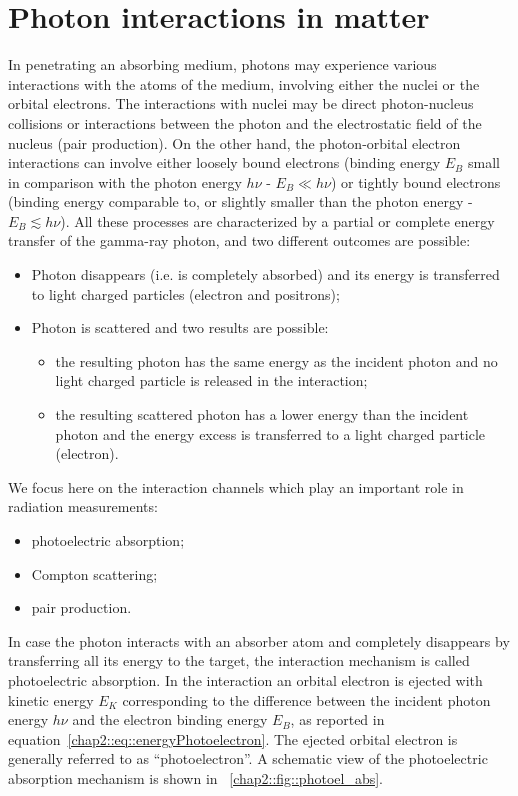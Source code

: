 \section{Photon interactions in matter}\label{chap2::subsec::PhotonInteractions}

In penetrating an absorbing medium, photons may experience various interactions with the atoms of the medium, involving either the nuclei or the orbital electrons. The interactions with nuclei may be direct photon-nucleus collisions or interactions between the photon and the electrostatic field of the nucleus (pair production). On the other hand, the photon-orbital electron interactions can involve either loosely bound electrons (binding energy $E_B$ small in comparison with the photon energy $h\nu$ - $E_B \ll h\nu$) or tightly bound electrons (binding energy comparable to, or slightly smaller than the photon energy - $E_B  \lesssim h\nu$). 
All these processes are characterized by a partial or complete energy transfer of the gamma-ray photon, and two different outcomes are possible:
\begin{itemize}
\item Photon disappears (i.e. is completely absorbed) and its energy is transferred to light charged particles (electron and positrons);
\item Photon is scattered and two results are possible:
	\begin{itemize}
		\item the resulting photon has the same energy as the incident photon and no light charged particle is released in the interaction;
		\item the resulting scattered photon has a lower energy than the incident photon and the energy excess is transferred to a light charged particle (electron).
	\end{itemize}
\end{itemize}

We focus here on the interaction channels which play an important role in radiation measurements: 
\begin{itemize}
\item photoelectric absorption;
\item Compton scattering;
\item pair production.
\end{itemize}

In case the photon interacts with an absorber  atom and completely disappears by transferring all its energy to the target, the interaction mechanism is called photoelectric absorption. In the interaction an orbital electron  is ejected with kinetic energy $E_K$ corresponding to the difference between the incident photon energy $h\nu$ and the electron binding energy $E_B$, as reported in equation~\ref{chap2::eq::energyPhotoelectron}. The ejected orbital electron is generally referred to as \enquote{photoelectron}. A schematic view of the photoelectric absorption mechanism is shown in \figurename~\ref{chap2::fig::photoel_abs}.


